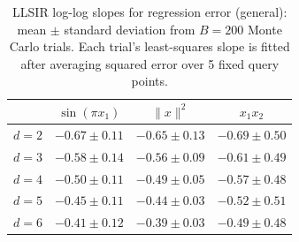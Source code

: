 \begin{table}[htbp]
\small
\centering
\begin{tabular}{lccc}
\toprule
 & $\sin(\pi x_1)$ & $\|x\|^2$ & $x_1x_2$ \\
\midrule
$d=2$ & $-0.67 \pm 0.11$ & $-0.65 \pm 0.13$ & $-0.69 \pm 0.50$ \\
$d=3$ & $-0.58 \pm 0.14$ & $-0.56 \pm 0.09$ & $-0.61 \pm 0.49$ \\
$d=4$ & $-0.50 \pm 0.11$ & $-0.49 \pm 0.05$ & $-0.57 \pm 0.48$ \\
$d=5$ & $-0.45 \pm 0.11$ & $-0.44 \pm 0.03$ & $-0.52 \pm 0.51$ \\
$d=6$ & $-0.41 \pm 0.12$ & $-0.39 \pm 0.03$ & $-0.49 \pm 0.48$ \\
\bottomrule
\end{tabular}
\caption{LLSIR log-log slopes for regression error (general): mean $\pm$ standard deviation from $B=200$ Monte Carlo trials. Each trial's least-squares slope is fitted after averaging squared error over 5 fixed query points. }
\label{tab:reg-general}
\end{table}
